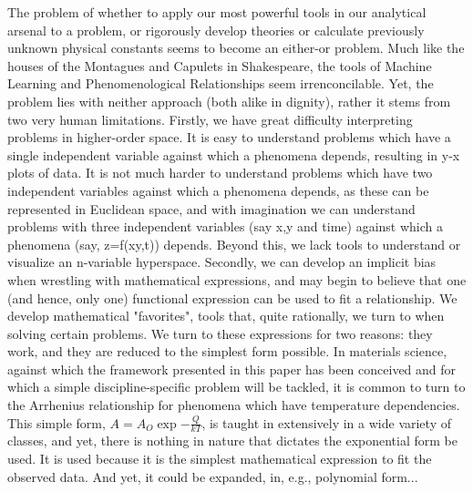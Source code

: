 The problem of whether to apply our most powerful tools in our analytical arsenal to a problem, or rigorously develop theories or calculate previously unknown physical constants seems to become an either-or problem.  Much like the houses of the Montagues and Capulets in Shakespeare, the tools of Machine Learning and Phenomenological Relationships seem irrenconcilable. Yet, the problem lies with neither approach (both alike in dignity), rather it stems from two very human limitations. Firstly, we have great difficulty interpreting problems in higher-order space.  It is easy to understand problems which have a single independent variable against which a phenomena depends, resulting in y-x plots of data.  It is not much harder to understand problems which have two independent variables against which a phenomena depends, as these can be represented in Euclidean space, and with imagination we can understand problems with three independent variables (say x,y and time) against which a phenomena (say, z=f(xy,t)) depends.  Beyond this, we lack tools to understand or visualize an n-variable hyperspace.  Secondly, we can develop an implicit bias when wrestling with mathematical expressions, and may begin to believe that one (and hence, only one) functional expression can be used to fit a relationship.  We develop mathematical "favorites", tools that, quite rationally, we turn to when solving certain problems.  We turn to these expressions for two reasons: they work, and they are reduced to the simplest form possible.  In materials science, against which the framework presented in this paper has been conceived and for which a simple discipline-specific problem will be tackled, it is common to turn to the Arrhenius relationship for phenomena which have temperature dependencies.  This simple form, $A=A_O\exp{-\frac{Q}{kT}}$, is taught in extensively in a wide variety of classes, and yet, there is nothing in nature that dictates the exponential form be used.  It is used because it is the simplest mathematical expression to fit the observed data.  And yet, it could be expanded, in, e.g., polynomial form... \\

